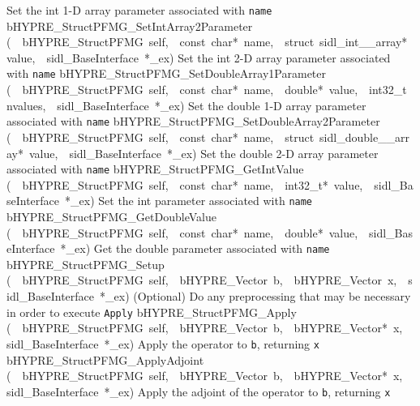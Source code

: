 \documentclass{article}
\begin{document}
\begin{cxxentry}
\begin{cxxentry}
\begin{cxxnames}
        {
Set the int 1-D array parameter associated with {\tt name}}
        {}
\label{cxx.7.3.20}
        {bHYPRE\_StructPFMG\_SetIntArray2Parameter}
        {(\ \ bHYPRE\_StructPFMG\ self,\ \ const\ char*\ name,\ \ struct\ sidl\_int\_\_array*\ value,\ \ sidl\_BaseInterface\ *\_ex)}
        {
Set the int 2-D array parameter associated with {\tt name}}
        {}
\label{cxx.7.3.21}
        {bHYPRE\_StructPFMG\_SetDoubleArray1Parameter}
        {(\ \ bHYPRE\_StructPFMG\ self,\ \ const\ char*\ name,\ \ double*\ value,\ \ int32\_t\ nvalues,\ \ sidl\_BaseInterface\ *\_ex)}
        {
Set the double 1-D array parameter associated with {\tt name}}
        {}
\label{cxx.7.3.22}
        {bHYPRE\_StructPFMG\_SetDoubleArray2Parameter}
        {(\ \ bHYPRE\_StructPFMG\ self,\ \ const\ char*\ name,\ \ struct\ sidl\_double\_\_array*\ value,\ \ sidl\_BaseInterface\ *\_ex)}
        {
Set the double 2-D array parameter associated with {\tt name}}
        {}
\label{cxx.7.3.23}
        {bHYPRE\_StructPFMG\_GetIntValue}
        {(\ \ bHYPRE\_StructPFMG\ self,\ \ const\ char*\ name,\ \ int32\_t*\ value,\ \ sidl\_BaseInterface\ *\_ex)}
        {
Set the int parameter associated with {\tt name}}
        {}
\label{cxx.7.3.24}
        {bHYPRE\_StructPFMG\_GetDoubleValue}
        {(\ \ bHYPRE\_StructPFMG\ self,\ \ const\ char*\ name,\ \ double*\ value,\ \ sidl\_BaseInterface\ *\_ex)}
        {
Get the double parameter associated with {\tt name}}
        {}
\label{cxx.7.3.25}
        {bHYPRE\_StructPFMG\_Setup}
        {(\ \ bHYPRE\_StructPFMG\ self,\ \ bHYPRE\_Vector\ b,\ \ bHYPRE\_Vector\ x,\ \ sidl\_BaseInterface\ *\_ex)}
        {
(Optional) Do any preprocessing that may be necessary in
order to execute {\tt Apply}}
        {}
\label{cxx.7.3.26}
        {bHYPRE\_StructPFMG\_Apply}
        {(\ \ bHYPRE\_StructPFMG\ self,\ \ bHYPRE\_Vector\ b,\ \ bHYPRE\_Vector*\ x,\ \ sidl\_BaseInterface\ *\_ex)}
        {
Apply the operator to {\tt b}, returning {\tt x}}
        {}
\label{cxx.7.3.27}
        {bHYPRE\_StructPFMG\_ApplyAdjoint}
        {(\ \ bHYPRE\_StructPFMG\ self,\ \ bHYPRE\_Vector\ b,\ \ bHYPRE\_Vector*\ x,\ \ sidl\_BaseInterface\ *\_ex)}
        {
Apply the adjoint of the operator to {\tt b}, returning {\tt x}}

\end{cxxnames}
\end{cxxentry}
\end{cxxentry}
\end{document}
